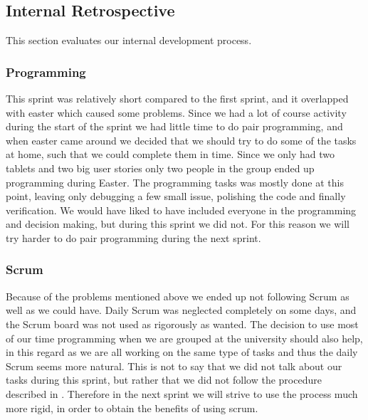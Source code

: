 \subsection{Internal Retrospective}\label{internal2}
This section evaluates our internal development process.

\subsubsection{Programming}
This sprint was relatively short compared to the first sprint, and it overlapped with easter which caused some problems.
Since we had a lot of course activity during the start of the sprint we had little time to do pair programming, and when easter came around we decided that we should try to do some of the tasks at home, such that we could complete them in time.
Since we only had two tablets and two big user stories only two people in the group ended up programming during Easter.
The programming tasks was mostly done at this point, leaving only debugging a few small issue, polishing the code and finally verification.
We would have liked to have included everyone in the programming and decision making, but during this sprint we did not.
For this reason we will try harder to do pair programming during the next sprint.

\subsubsection{Scrum}
Because of the problems mentioned above we ended up not following Scrum as well as we could have.
Daily Scrum was neglected completely on some days, and the Scrum board was not used as rigorously as wanted.
The decision to use most of our time programming when we are grouped at the university should also help, in this regard as we are all working on the same type of tasks and thus the daily Scrum seems more natural.
This is not to say that we did not talk about our tasks during this sprint, but rather that we did not follow the procedure described in .
Therefore in the next sprint we will strive to use the process much more rigid, in order to obtain the benefits of using scrum.
